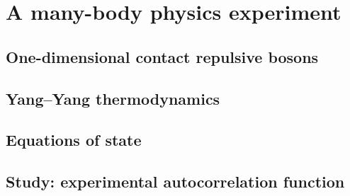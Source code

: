 
\renewcommand{\thechapter}{3}

\chapter{A many-body physics experiment}

\section{One-dimensional contact repulsive bosons}

\section{Yang--Yang thermodynamics}

\section{Equations of state}

\section{Study: experimental autocorrelation function}


